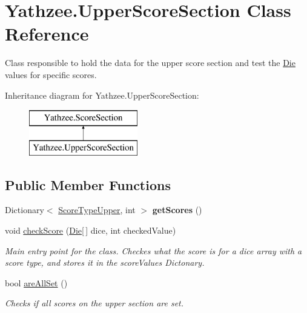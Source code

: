 \hypertarget{class_yathzee_1_1_upper_score_section}{}\section{Yathzee.\+Upper\+Score\+Section Class Reference}
\label{class_yathzee_1_1_upper_score_section}


Class responsible to hold the data for the upper score section and test the \hyperlink{class_yathzee_1_1_die}{Die} values for specific scores.  


Inheritance diagram for Yathzee.\+Upper\+Score\+Section\+:\begin{figure}[H]
\begin{center}
\leavevmode
\includegraphics[height=2.000000cm]{class_yathzee_1_1_upper_score_section}
\end{center}
\end{figure}
\subsection*{Public Member Functions}
\begin{DoxyCompactItemize}
\item 
Dictionary$<$ \hyperlink{namespace_yathzee_af9eae2784d7776b80bb77da141a63b7f}{Score\+Type\+Upper}, int $>$ {\bfseries get\+Scores} ()\hypertarget{class_yathzee_1_1_upper_score_section_aa10b4b6d4c7038e80c9d221bfb482b72}{}\label{class_yathzee_1_1_upper_score_section_aa10b4b6d4c7038e80c9d221bfb482b72}

\item 
void \hyperlink{class_yathzee_1_1_upper_score_section_ae2db6ea707243900dc1b87cdc4ff9e2f}{check\+Score} (\hyperlink{class_yathzee_1_1_die}{Die}\mbox{[}$\,$\mbox{]} dice, int checked\+Value)
\begin{DoxyCompactList}\small\item\em Main entry point for the class. Checkes what the score is for a dice array with a score type, and stores it in the score\+Values Dictonary. \end{DoxyCompactList}\item 
bool \hyperlink{class_yathzee_1_1_upper_score_section_ab539f23446aface95d748a3ebc5396d2}{are\+All\+Set} ()
\begin{DoxyCompactList}\small\item\em Checks if all scores on the upper section are set. \end{DoxyCompactList}\end{DoxyCompactItemize}

